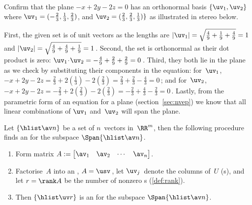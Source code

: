 \begin{example} \label{eg:orthbas2}
Confirm that the plane \(-x+2y-2z=0\) has an orthonormal basis \(\{\uv_1,\uv_2\}\) where \(\uv_1=(-\frac23,\frac13,\frac23)\), and \(\uv_2=(\frac23,\frac23,\frac13)\}\) as illustrated in stereo below.
\begin{center}
 {}
\end{center}
\begin{solution} 
First, the given set is of unit vectors as the lengths are \(|\uv_1|=\sqrt{\frac49+\frac19+\frac49}=1\) and \(|\uv_2|=\sqrt{\frac49+\frac49+\frac19}=1\)\,.
Second, the set is orthonormal as their dot product is zero: \(\uv_1\cdot\uv_2=-\frac49+\frac29+\frac29=0\)\,.
Third, they both lie in the plane as we check by substituting their components in the equation: for~\(\uv_1\), \(-x+2y-2z=\frac23+2(\frac13)-2(\frac23)=\frac23+\frac23-\frac43=0\)\,; and for~\(\uv_2\), \(-x+2y-2z=-\frac23+2(\frac23)-2(\frac23)=-\frac23+\frac43-\frac23=0\)\,.
Lastly, from the parametric form of an equation for a plane (section~\ref{sec:nvep}) we know that all linear combinations of \(\uv_1\) and~\(\uv_2\) will span the plane.
\end{solution}
\end{example}





\begin{procedure}\label{pro:ospan}
	Let $\{\hlist\av n\}$ be a set of $n$~vectors in~\(\RR^m\), then the following procedure finds an  for the subspace \(\Span\{\hlist\av n\}\). 
\begin{enumerate}
\item Form matrix $A:= \begin{bmatrix} \av_1 & \av_2& \cdots&\av_n \end{bmatrix}$. 
\item Factorise~\(A\) into an \svd, $A=\usv$\,, let \(\uv_j\)~denote the columns of~$U$ (s), and let \(r=\rank A\) be the number of nonzero s (\autoref{def:rank}).  
\item Then \(\{\hlist\uv r\}\) is an  for the subspace \(\Span\{\hlist\av n\}\).
\end{enumerate}
\end{procedure}

